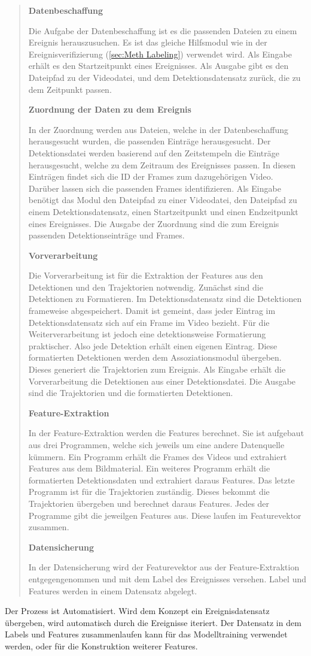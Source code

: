 \begin{quote}
\par
\textbf{Datenbeschaffung}\par
Die Aufgabe der Datenbeschaffung ist es die passenden Dateien zu einem Ereignis herauszusuchen. Es ist das gleiche Hilfsmodul wie in der Ereignisverifizierung (\ref{sec:Meth Labeling}) verwendet wird. Als Eingabe erhält es den Startzeitpunkt eines Ereignisses. Als Ausgabe gibt es den Dateipfad zu der Videodatei, und dem Detektionsdatensatz zurück, die zu dem Zeitpunkt passen. \dubpar

\textbf{Zuordnung der Daten zu dem Ereignis}\par
In der Zuordnung werden aus Dateien, welche in der Datenbeschaffung herausgesucht wurden, die passenden Einträge herausgesucht. Der Detektionsdatei werden basierend auf den Zeitstempeln die Einträge herausgesucht, welche zu dem Zeitraum des Ereignisses passen. In diesen Einträgen findet sich die ID der Frames zum dazugehörigen Video. Darüber lassen sich die passenden Frames identifizieren. Als Eingabe benötigt das Modul den Dateipfad zu einer Videodatei, den Dateipfad zu einem Detektionsdatensatz, einen Startzeitpunkt und einen Endzeitpunkt eines Ereignisses. Die Ausgabe der Zuordnung sind die zum Ereignis passenden Detektionseinträge und Frames. \dubpar

\textbf{Vorverarbeitung}\par
Die Vorverarbeitung ist für die Extraktion der Features aus den Detektionen und den Trajektorien notwendig. Zunächst sind die Detektionen zu Formatieren. Im Detektionsdatensatz sind die Detektionen frameweise abgespeichert. Damit ist gemeint, dass jeder Eintrag im Detektionsdatensatz sich auf ein Frame im Video bezieht. Für die Weiterverarbeitung ist jedoch eine detektionsweise Formatierung praktischer. Also jede Detektion erhält einen eigenen Eintrag. Diese formatierten Detektionen werden dem Assoziationsmodul übergeben. Dieses generiert die Trajektorien zum Ereignis. Als Eingabe erhält die Vorverarbeitung die Detektionen aus einer Detektionsdatei. Die Ausgabe sind die Trajektorien und die formatierten Detektionen. \dubpar

\textbf{Feature-Extraktion}\par
In der Feature-Extraktion werden die Features berechnet. Sie ist aufgebaut aus drei Programmen, welche sich jeweils um eine andere Datenquelle kümmern. Ein Programm erhält die Frames des Videos und extrahiert Features aus dem Bildmaterial. Ein weiteres Programm erhält die formatierten Detektionsdaten und extrahiert daraus Features. Das letzte Programm ist für die Trajektorien zuständig. Dieses bekommt die Trajektorien übergeben und berechnet daraus Features. Jedes der Programme gibt die jeweilgen Features aus. Diese laufen im Featurevektor zusammen. \dubpar

\textbf{Datensicherung}\par
In der Datensicherung wird der Featurevektor aus der Feature-Extraktion entgegengenommen und mit dem Label des Ereignisses versehen. Label und Features werden in einem Datensatz abgelegt. 

\end{quote}

Der Prozess ist Automatisiert. Wird dem Konzept ein Ereignisdatensatz übergeben, wird automatisch durch die Ereignisse iteriert. Der Datensatz in dem Labels und Features zusammenlaufen kann für das Modelltraining verwendet werden, oder für die Konstruktion weiterer Features.